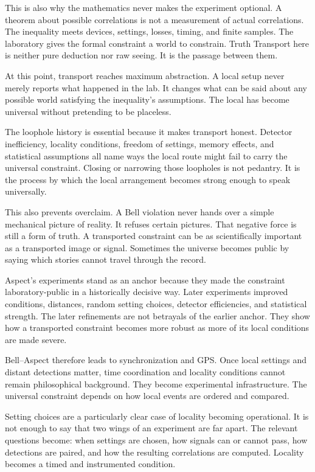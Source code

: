 This is also why the mathematics never makes the experiment optional. A
theorem about possible correlations is not a measurement of actual
correlations. The inequality meets devices, settings, losses, timing, and
finite samples. The laboratory gives the formal constraint a world to
constrain. Truth Transport here is neither pure deduction nor raw seeing.
It is the passage between them.

At this point, transport reaches maximum abstraction. A local setup never merely reports what
happened in the lab. It changes what can be said about any possible world
satisfying the inequality's assumptions. The local has become universal
without pretending to be placeless.

The loophole history is essential because it makes transport honest.
Detector inefficiency, locality conditions, freedom of settings, memory
effects, and statistical assumptions all name ways the local route might
fail to carry the universal constraint. Closing or narrowing those
loopholes is not pedantry. It is the process by which the local
arrangement becomes strong enough to speak universally.

This also prevents overclaim. A Bell violation never hands over a simple
mechanical picture of reality. It refuses certain pictures. That negative
force is still a form of truth. A transported constraint can be as
scientifically important as a transported image or signal. Sometimes the
universe becomes public by saying which stories cannot travel through the
record.

Aspect's experiments stand as an anchor because they made the constraint
laboratory-public in a historically decisive way. Later experiments
improved conditions, distances, random setting choices, detector
efficiencies, and statistical strength. The later refinements are not
betrayals of the earlier anchor. They show how a transported constraint
becomes more robust as more of its local conditions are made severe.

Bell--Aspect therefore leads to synchronization and GPS. Once local
settings and distant detections matter, time coordination and locality
conditions cannot remain philosophical background. They become
experimental infrastructure. The universal constraint depends on how
local events are ordered and compared.

Setting choices are a particularly clear case of locality becoming
operational. It is not enough to say that two wings of an experiment are
far apart. The relevant questions become: when settings are chosen, how
signals can or cannot pass, how detections are paired, and how the
resulting correlations are computed. Locality becomes a timed and
instrumented condition.

